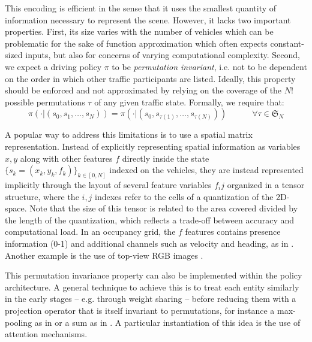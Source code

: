 \documentclass{article}
\begin{document}
This encoding is efficient in the sense that it uses the smallest quantity of information necessary to represent the scene. However, it lacks two important properties. First, its size varies with the number of vehicles which can be problematic for the sake of function approximation which often expects constant-sized inputs, but also for concerns of varying computational complexity. Second, we expect a driving policy $\pi$ to be \emph{permutation invariant}, i.e. not to be dependent on the order in which other traffic participants are listed. Ideally, this property should be enforced and not approximated by relying on the coverage of the $N!$ possible permutations $\tau$ of any given traffic state. Formally, we require that:
\begin{equation*}
\pi(\cdot|(s_0, s_1,\dotsc,s_N)) = \pi(\cdot|(s_0, s_{\tau(1)},\dotsc,s_{\tau(N)})) \quad\quad\quad \forall\tau \in \mathfrak{S}_N
\end{equation*}

A popular way to address this limitations is to use a spatial matrix representation. Instead of explicitly representing spatial information as variables $x, y$ along with other features $f$ directly inside the state $\{s_k=(x_k,y_k,f_k)\}_{k\in[0,N]}$ indexed on the vehicles, they are instead represented implicitly through the layout of several feature variables $f_ij$ organized in a tensor structure, where the $i,j$ indexes refer to the cells of a quantization of the 2D-space. Note that the size of this tensor is related to the area covered divided by the length of the quantization, which reflects a trade-off between accuracy and computational load.
In an occupancy grid, the $f$ features contains presence information (0-1) and additional channels such as velocity and heading, as in \citep{Isele2017, Fridman2018, Bansal2018, Rehder2017c}. Another example is the use of top-view RGB images \citep{Bagnell2010, Rehder2017, Rehder2017c, Liu2018}.


This permutation invariance property can also be implemented within the policy architecture. A general technique to achieve this is to treat each entity similarly in the early stages -- e.g. through weight sharing -- before reducing them with a projection operator that is itself invariant to permutations, for instance a max-pooling as in \citep{Chen2017} or a sum as in \citep{Qi2016}. A particular instantiation of this idea is the use of attention mechanisms.
\end{document}
